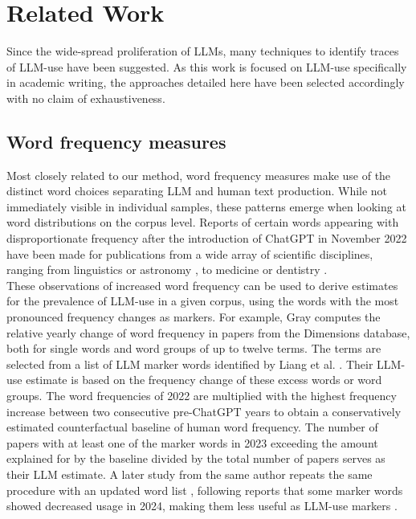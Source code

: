 \chapter{Related Work}\label{sec:related}

Since the wide-spread proliferation of LLMs, many techniques to identify traces of LLM-use have been suggested.
As this work is focused on LLM-use specifically in academic writing, the approaches detailed here have been selected accordingly with no claim of exhaustiveness.

\section{Word frequency measures}
Most closely related to our method, word frequency measures make use of the distinct word choices separating LLM and human text production.
While not immediately visible in individual samples, these patterns emerge when looking at word distributions on the corpus level.
Reports of certain words appearing with disproportionate frequency after the introduction of ChatGPT in November 2022 have been made for publications from a wide array of scientific disciplines, ranging from linguistics \cite{Botes2025} or astronomy \cite{Astarita2024}, to medicine \cite{Matsui2024} or dentistry \cite{Uribe2024}.
\\
These observations of increased word frequency can be used to derive estimates for the prevalence of LLM-use in a given corpus, using the words with the most pronounced frequency changes as markers.
For example, Gray \cite{Gray2025} computes the relative yearly change of word frequency in papers from the Dimensions database, both for single words and word groups of up to twelve terms.
The terms are selected from a list of LLM marker words identified by Liang et al. \cite{Liang2024_review}.
Their LLM-use estimate is based on the frequency change of these excess words or word groups.
The word frequencies of 2022 are multiplied with the highest frequency increase between two consecutive pre-ChatGPT years to obtain a conservatively estimated counterfactual baseline of human word frequency. 
The number of papers with at least one of the marker words in 2023 exceeding the amount explained for by the baseline divided by the total number of papers serves as their LLM estimate.
A later study from the same author repeats the same procedure with an updated word list \cite{Gray2025}, following reports that some marker words showed decreased usage in 2024, making them less useful as LLM-use markers \cite{Geng2025}.
